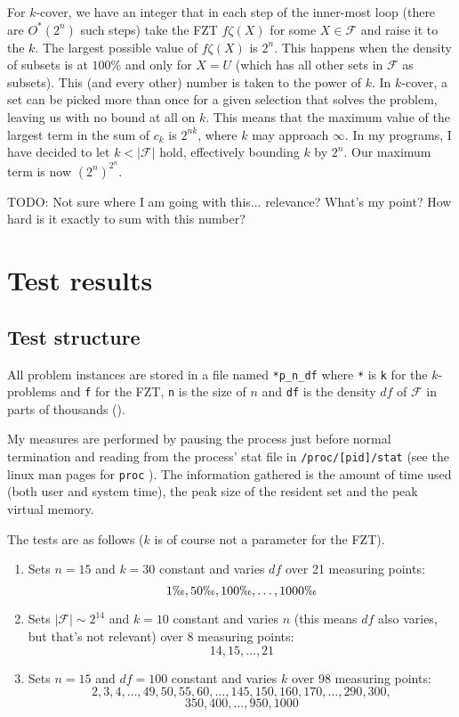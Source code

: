 \documentclass[a4paper, titlepage]{article}
\newcommand{\code}{\texttt}
\begin{document}
For $k$-cover, we have an integer that in each step of the inner-most loop (there are $O^*(2^n)$ such steps) take the FZT $f\zeta(X)$ for some $ X \in \mathcal{F}$ and raise it to the $k$. The largest possible value of $f\zeta(X)$ is $2^n$. This happens when the density of subsets is at $100\%$ and only for $X=U$ (which has all other sets in $\mathcal{F}$ as subsets). This (and every other) number is taken to the power of $k$. In $k$-cover, a set can be picked more than once for a given selection that solves the problem, leaving us with no bound at all on $k$. This means that the maximum value of the largest term in the sum of $c_k$ is $2^{nk}$, where $k$ may approach $\infty$. In my programs, I have decided to let $k < |\mathcal{F}|$ hold, effectively bounding $k$ by $2^n$. Our maximum term is now $(2^n)^{2^n}$. 

TODO: Not sure where I am going with this... relevance? What's my point? How hard is it exactly to sum with this number? 

\section{Test results}

\subsection{Test structure}
All problem instances are stored in a file named \code{*p\_n\_df} where \code{*} is \code{k} for the $k$-problems and \code{f} for the FZT, \code{n} is the size of $n$ and \code{df} is the density $df$ of $\mathcal{F}$ in parts of thousands (\permil).

My measures are performed by pausing the process just before normal termination and reading from the process' stat file in \code{/proc/[pid]/stat} (see the linux man pages for \code{proc} \cite{proc}). The information gathered is the amount of time used (both user and system time), the peak size of the resident set and the peak virtual memory.

The tests are as follows ($k$ is of course not a parameter for the FZT).

\begin{enumerate}
 \item Sets $n = 15$ and $k = 30$ constant and varies $df$ over 21 measuring points: $$1\permil, 50\permil, 100\permil, \ldots, 1000\permil$$
 \item Sets $|\mathcal{F}| \sim 2^{14}$ and $k = 10$ constant and varies $n$ (this means $df$ also varies, but that's not relevant) over 8 measuring points: $$14, 15, \ldots, 21$$
 \item Sets $n = 15$ and $df = 100$ constant and varies $k$ over 98 measuring points: $$2, 3, 4, \ldots, 49, 50, 55, 60, \ldots, 145, 150, 160, 170, \ldots, 290, 300, $$ $$350, 400, \ldots, 950, 1000 $$

\end{enumerate}
\end{document}
